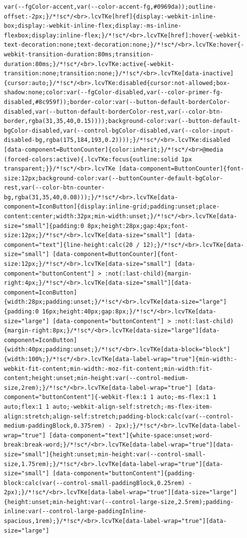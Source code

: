 \documentclass[
  letterpaper,
]{book}
\begin{document}
\begin{verbatim}
var(--fgColor-accent,var(--color-accent-fg,#0969da));outline-offset:-2px;}/*!sc*/<br>.lcvTKe[href]{display:-webkit-inline-box;display:-webkit-inline-flex;display:-ms-inline-flexbox;display:inline-flex;}/*!sc*/<br>.lcvTKe[href]:hover{-webkit-text-decoration:none;text-decoration:none;}/*!sc*/<br>.lcvTKe:hover{-webkit-transition-duration:80ms;transition-duration:80ms;}/*!sc*/<br>.lcvTKe:active{-webkit-transition:none;transition:none;}/*!sc*/<br>.lcvTKe[data-inactive]{cursor:auto;}/*!sc*/<br>.lcvTKe:disabled{cursor:not-allowed;box-shadow:none;color:var(--fgColor-disabled,var(--color-primer-fg-disabled,#8c959f));border-color:var(--button-default-borderColor-disabled,var(--button-default-borderColor-rest,var(--color-btn-border,rgba(31,35,40,0.15))));background-color:var(--button-default-bgColor-disabled,var(--control-bgColor-disabled,var(--color-input-disabled-bg,rgba(175,184,193,0.2))));}/*!sc*/<br>.lcvTKe:disabled [data-component=ButtonCounter]{color:inherit;}/*!sc*/<br>@media (forced-colors:active){.lcvTKe:focus{outline:solid 1px transparent;}}/*!sc*/<br>.lcvTKe [data-component=ButtonCounter]{font-size:12px;background-color:var(--buttonCounter-default-bgColor-rest,var(--color-btn-counter-bg,rgba(31,35,40,0.08)));}/*!sc*/<br>.lcvTKe[data-component=IconButton]{display:inline-grid;padding:unset;place-content:center;width:32px;min-width:unset;}/*!sc*/<br>.lcvTKe[data-size="small"]{padding:0 8px;height:28px;gap:4px;font-size:12px;}/*!sc*/<br>.lcvTKe[data-size="small"] [data-component="text"]{line-height:calc(20 / 12);}/*!sc*/<br>.lcvTKe[data-size="small"] [data-component=ButtonCounter]{font-size:12px;}/*!sc*/<br>.lcvTKe[data-size="small"] [data-component="buttonContent"] > :not(:last-child){margin-right:4px;}/*!sc*/<br>.lcvTKe[data-size="small"][data-component=IconButton]{width:28px;padding:unset;}/*!sc*/<br>.lcvTKe[data-size="large"]{padding:0 16px;height:40px;gap:8px;}/*!sc*/<br>.lcvTKe[data-size="large"] [data-component="buttonContent"] > :not(:last-child){margin-right:8px;}/*!sc*/<br>.lcvTKe[data-size="large"][data-component=IconButton]{width:40px;padding:unset;}/*!sc*/<br>.lcvTKe[data-block="block"]{width:100%;}/*!sc*/<br>.lcvTKe[data-label-wrap="true"]{min-width:-webkit-fit-content;min-width:-moz-fit-content;min-width:fit-content;height:unset;min-height:var(--control-medium-size,2rem);}/*!sc*/<br>.lcvTKe[data-label-wrap="true"] [data-component="buttonContent"]{-webkit-flex:1 1 auto;-ms-flex:1 1 auto;flex:1 1 auto;-webkit-align-self:stretch;-ms-flex-item-align:stretch;align-self:stretch;padding-block:calc(var(--control-medium-paddingBlock,0.375rem) - 2px);}/*!sc*/<br>.lcvTKe[data-label-wrap="true"] [data-component="text"]{white-space:unset;word-break:break-word;}/*!sc*/<br>.lcvTKe[data-label-wrap="true"][data-size="small"]{height:unset;min-height:var(--control-small-size,1.75rem);}/*!sc*/<br>.lcvTKe[data-label-wrap="true"][data-size="small"] [data-component="buttonContent"]{padding-block:calc(var(--control-small-paddingBlock,0.25rem) - 2px);}/*!sc*/<br>.lcvTKe[data-label-wrap="true"][data-size="large"]{height:unset;min-height:var(--control-large-size,2.5rem);padding-inline:var(--control-large-paddingInline-spacious,1rem);}/*!sc*/<br>.lcvTKe[data-label-wrap="true"][data-size="large"] 
\end{verbatim}
\end{document}
